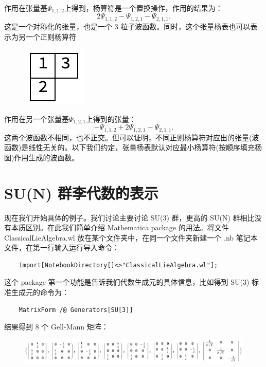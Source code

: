 \documentclass[UTF8]{ctexart}
\begin{document}
\noindent 作用在张量基$\Psi_{1,1,2}$上得到，杨算符是一个置换操作，作用的结果为：
\begin{equation}
	2 \Psi_{1,1,2} - \Psi_{1,2,1} - \Psi_{2,1,1}. 
\end{equation}
这是一个对称化的张量，也是一个 3 粒子波函数。同时，这个张量杨表也可以表示为另一个正则杨算符

\begin{figure}[H]
\begin{centering}
\includegraphics[width=.1\linewidth]{include/Y3}
\par\end{centering}
\end{figure}

\noindent 作用在另一个张量基$\Psi_{1,2,1}$上得到的张量：
\begin{equation}
	-\Psi_{1, 1, 2} + 2 \Psi_{1, 2, 1} - \Psi_{2, 1, 1}. 
\end{equation}
这两个波函数不相同，也不正交。但可以证明，不同正则杨算符对应出的张量(波函数)是线性无关的。以下我们约定，张量杨表默认对应最小杨算符(按顺序填充杨图)作用生成的波函数。

\section*{SU(N) 群李代数的表示}
\noindent 现在我们开始具体的例子。我们讨论主要讨论 SU(3) 群，更高的 SU(N) 群相比没有本质区别。在此我们简单介绍 Mathematica package 的用法。将文件ClassicalLieAlgebra.wl 放在某个文件夹中，在同一个文件夹新建一个 .nb 笔记本文件，在第一行输入运行导入命令：
\begin{verbatim}
	Import[NotebookDirectory[]<>"ClassicalLieAlgebra.wl"];
\end{verbatim}
这个 package 第一个功能是告诉我们代数生成元的具体信息，比如得到 SU(3) 标准生成元的命令为：
\begin{verbatim}
	MatrixForm /@ Generators[SU[3]]
\end{verbatim}
结果得到 8 个 Gell-Mann 矩阵：

\begin{figure}[H]
\begin{centering}
\includegraphics[width=0.95\linewidth]{include/O1}
\par\end{centering}
\end{figure}
\end{document}
